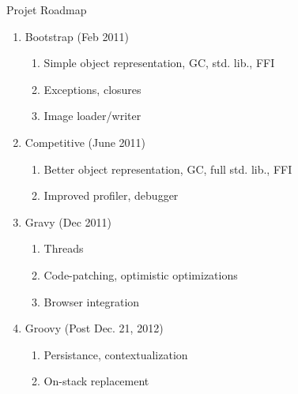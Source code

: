 \begin{frame}{Projet Roadmap}
    \begin{enumerate}
        \item Bootstrap (Feb 2011)
        \begin{enumerate}
            \item Simple object representation, GC, std. lib., FFI
            \item Exceptions, closures
            \item Image loader/writer
        \end{enumerate}

        \item Competitive (June 2011)
        \begin{enumerate}
            \item Better object representation, GC, full std. lib., FFI
            \item Improved profiler, debugger
        \end{enumerate}

        \item Gravy (Dec 2011)
        \begin{enumerate}
            \item Threads 
            \item Code-patching, optimistic optimizations
            \item Browser integration
        \end{enumerate}

        \item Groovy (Post Dec. 21, 2012)
        \begin{enumerate}
            \item Persistance, contextualization
            \item On-stack replacement
        \end{enumerate}
    \end{enumerate}
\end{frame}

